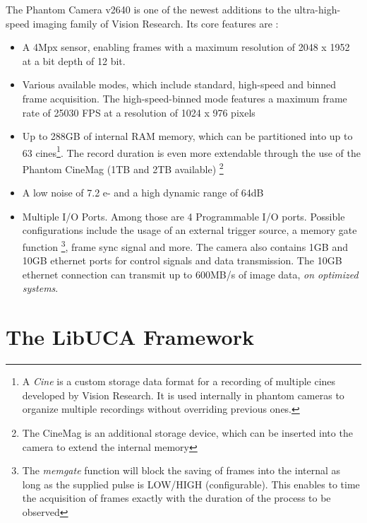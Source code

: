 The Phantom Camera v2640 is one of the newest additions to the ultra-high-speed imaging family of Vision Research. Its core features are \cite{PhantomDatasheet}:
\begin{itemize}
\item A 4Mpx sensor, enabling frames with a maximum resolution of 2048 x 1952 at a bit depth of 12 bit.

\item Various available modes, which include standard, high-speed and binned frame acquisition. The high-speed-binned mode features a maximum frame rate of 25030 FPS at a resolution of 1024 x 976 pixels 

\item Up to 288GB of internal RAM memory, which can be partitioned into up to 63 cines\footnote{A \textit{Cine} is a custom storage data format for a recording of multiple cines developed by Vision Research. It is used internally in phantom cameras to organize multiple recordings without overriding previous ones.}. The record duration is even more extendable through the use of the Phantom CineMag \texttrademark (1TB and 2TB available) \footnote{The CineMag is an additional storage device, which can be inserted into the camera to extend the internal memory}

\item A low noise of 7.2 e- and a high dynamic range of 64dB

\item Multiple I/O Ports. Among those are 4 Programmable I/O ports. Possible configurations include the usage of an external trigger source, a memory gate function \footnote{The \textit{memgate} function will block the saving of frames into the internal as long as the supplied pulse is LOW/HIGH (configurable). This enables to time the acquisition of frames exactly with the duration of the process to be observed}, frame sync signal and more. The camera also contains 1GB and 10GB ethernet ports for control signals and data transmission. The 10GB ethernet connection can transmit up to 600MB/s of image data, \textit{on optimized systems}.
\end{itemize}

\section{The LibUCA Framework}

